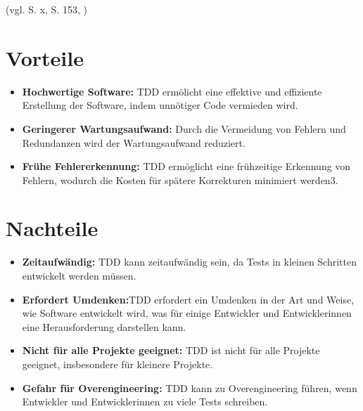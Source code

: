 \documentclass[a0,landscape]{a0poster}
\begin{document}
\begin{multicols}{4}
(vgl. \cite{beck_test_2022} S. x, \cite{schatten_qualitatssicherung_2010} S. 153, \cite{ionos_test_2020})


\section*{Vorteile}

\begin{itemize}
    \item \textbf{Hochwertige Software:} TDD ermölicht eine effektive und effiziente Erstellung der Software, indem unnötiger Code vermieden wird.
    \item \textbf{Geringerer Wartungsaufwand:} Durch die Vermeidung von Fehlern und Redundanzen wird der Wartungsaufwand reduziert.
    \item \textbf{Frühe Fehlererkennung:} TDD ermöglicht eine frühzeitige Erkennung von Fehlern, wodurch die Kosten für spätere Korrekturen minimiert werden3.
\end{itemize}

\section*{Nachteile}
\begin{itemize}
    \item \textbf{Zeitaufwändig:} TDD kann zeitaufwändig sein, da Tests in kleinen Schritten entwickelt werden müssen.
    \item \textbf{Erfordert Umdenken:}TDD erfordert ein Umdenken in der Art und Weise, wie Software entwickelt wird, was für einige Entwickler und Entwicklerinnen eine Herausforderung darstellen kann.
    \item \textbf{Nicht für alle Projekte geeignet:} TDD ist nicht für alle Projekte geeignet, insbesondere für kleinere Projekte.
    \item \textbf{Gefahr für Overengineering:} TDD kann zu Overengineering führen, wenn Entwickler und Entwicklerinnen zu viele Tests schreiben.
\end{itemize}


\end{multicols}
\end{document}
